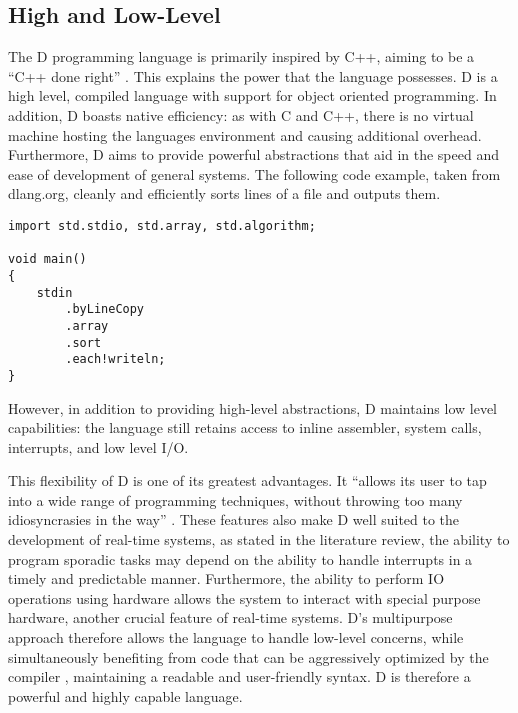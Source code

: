 \subsection{High and Low-Level}
The D programming language is primarily inspired by C++, aiming to be a ``C++ done
right'' 
\cite{qznc-tutorial}. 
This explains the power that the language possesses. D is a high level, compiled 
language with support for object oriented programming. In addition, D boasts 
native efficiency: as with C and C++, there is no virtual 
machine hosting the languages environment and causing additional overhead. 
Furthermore, D aims to provide
powerful abstractions that aid in the speed and ease of development of general systems. 
The following code example, taken from dlang.org, cleanly and efficiently 
sorts lines of a file and outputs them. 
\begin{lstlisting}
import std.stdio, std.array, std.algorithm;

void main()
{
    stdin
        .byLineCopy
        .array
        .sort
        .each!writeln;
}
\end{lstlisting}
However, in addition to providing high-level abstractions, D maintains low 
level capabilities: the language still retains access to inline assembler, 
system calls, interrupts, and low level I/O.
\par\bigskip\noindent
This flexibility of D is one of its greatest advantages. It ``allows its user to tap 
into a wide range of programming techniques, without throwing too many 
idiosyncrasies in the way'' \cite{ddili-book}. 
These features also make D well suited to the development of real-time systems, 
as stated in the literature review, the ability to program sporadic tasks
may depend on the ability to handle interrupts in a timely and predictable manner.
Furthermore, the ability to perform IO operations using hardware allows the
system to interact with special purpose hardware, another crucial feature of
real-time systems.
D's multipurpose approach therefore allows the language to handle low-level concerns,
while simultaneously benefiting from code that can be aggressively optimized by the
compiler \cite{dlang-overview}, maintaining a readable and user-friendly
syntax. D is therefore a powerful and highly capable language.

